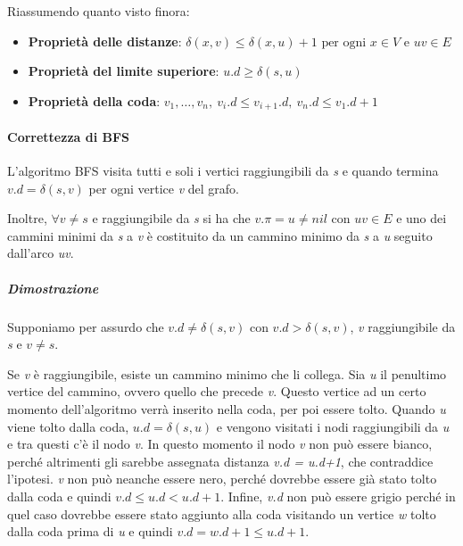 
Riassumendo quanto visto finora:

\begin{itemize}
	\item
	\textbf{Proprietà delle distanze}: $\delta(x,v) \leq \delta(x,u) + 1 \text{ per ogni } x \in V \text{ e } uv \in E$
\item
  \textbf{Proprietà del limite superiore}: $u.d \geq \delta(s,u)$ 
\item
  \textbf{Proprietà della coda}: $v_1, \ldots, v_n, \: v_i.d \leq v_{i+1}.d, \: v_n.d \leq v_1.d+1$ 
\end{itemize}

\paragraph{Correttezza di BFS}

L'algoritmo BFS visita tutti e soli i vertici raggiungibili da \emph{s} e
quando termina $v.d = \delta(s,v)$ per ogni vertice \emph{v} del
grafo.

Inoltre, $\forall v \neq s$ e raggiungibile da \emph{s} si ha che $v.\pi
= u \neq nil$ con $uv \in E$ e uno dei cammini minimi da \emph{s} a
\emph{v} è costituito da un cammino minimo da \emph{s} a \emph{u}
seguito dall'arco \emph{uv}.

\subparagraph{Dimostrazione}

Supponiamo per assurdo che $v.d \neq \delta(s,v)$ con $v.d > \delta(s,v)$, \emph{v} raggiungibile da \emph{s} e
$v\neq s$.

Se \emph{v} è raggiungibile, esiste un cammino minimo che li collega.
Sia \emph{u} il penultimo vertice del cammino, ovvero quello che precede
\emph{v}. Questo vertice ad un certo momento dell'algoritmo verrà
inserito nella coda, per poi essere tolto. Quando \emph{u} viene tolto
dalla coda, $u.d = \delta(s,u)$ e vengono visitati i nodi
raggiungibili da \emph{u} e tra questi c'è il nodo \emph{v}. In questo
momento il nodo \emph{v} non può essere bianco, perché altrimenti gli
sarebbe assegnata distanza \emph{v.d = u.d+1}, che contraddice
l'ipotesi. \emph{v} non può neanche essere nero, perché dovrebbe essere
già stato tolto dalla coda e quindi $v.d \leq u.d < u.d+1$. Infine, \emph{v.d} non può essere grigio perché in
quel caso dovrebbe essere stato aggiunto alla coda visitando un vertice
\emph{w} tolto dalla coda prima di \emph{u} e quindi $v.d = w.d+1
\leq u.d+1$.

